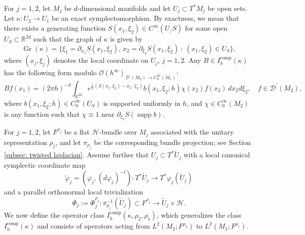 \documentclass[11pt,oneside,reqno]{amsart}
\newcommand\R{\ensuremath{\mathbb{R}}}
\theoremstyle{definition}
\numberwithin{equation}{section}
\theoremstyle{plain}
\begin{document}
For $j=1,2$, let $M_{j}$ be $d$-dimensional manifolds and let $U_j\subset T^*M_j$ be open sets. Let $\kappa: U_2 \rightarrow U_1 $ be an exact symplectomorphism. By exactness, we mean that there exists a generating function $S(x_1,\xi_2)\in C^\infty (U_/S)$ for some open $U_S\subset \R^{2d}$ such that the graph of $\kappa$ is given by 
\begin{equation*}
    \operatorname{Gr}(\kappa)= \{\xi_{1}=\partial_{x_1} S(x_1, \xi_2), \, x_{2}=\partial_{\xi_2} S(x_1, \xi_2)\ : \  (x_1, \xi_2) \in U_S \},
\end{equation*}
where $(x_j,\xi_j)$ denotes the local coordinate on $U_j$, $j=1,2$. Any $B \in I_h^{\mathrm{comp}}(\kappa)$ has the following form modulo $\mathcal{O}(h^{\infty})_{\mathcal{D}^{\prime}\left(M_2\right) \rightarrow C_0^{\infty}\left(M_1\right)}$:
\begin{equation*}
    B f(x_1)=(2 \pi h)^{-d} \int_{\mathbb{R}^{2d}} e^{\frac{i}{h}(S(x_1, \xi_2)-x_2 \cdot \xi_2)} b(x_1, \xi_2 ; h) \chi(x_2) f(x_2) \,d x_2 d \xi_2, \quad f \in \mathcal{D}^{\prime}(M_2),
\end{equation*}
where $b(x_1, \xi_2 ; h) \in C_{0}^{\infty}(U_S)$ is supported uniformly in $h$, and $\chi \in C_0^{\infty} (M_2 )$ is any function such that $\chi \equiv 1$ near $\partial_{\xi_2} S(\operatorname{supp} b)$.

For $j=1,2$, let $F^{\rho_{j}}$ be a flat $\mathcal{H}$-bundle over $M_{j}$ associated with the unitary representation $\rho_j$, and let $\pi_{\rho_j}$ be the corresponding bundle projection; see Section \ref{subsec: twisted laplacian}. Assume further that $U_{j} \subset T^*\widetilde{U}_{j}$ with a local canonical symplectic coordinate map 
\begin{equation*}
    \widetilde{\varphi}_{j}=(\varphi_{j},(d\varphi_{j})^{-t}): T^*\widetilde{U}_{j} \rightarrow T^* \varphi_j(\widetilde{U}_{j})
\end{equation*}
and a parallel orthonormal local trivialization
\begin{equation*}
    \Phi_{j}:=\Phi_{j}^{\rho_j}: \pi^{-1}_{\rho_{j}}(\widetilde{U}_{j}) \subset F^{\rho_j}\to \widetilde{U}_{j}\times \mathcal{H}.
\end{equation*}
We now define the operator class $I_{h}^{\mathrm{comp}}(\kappa,\rho_{2},\rho_{1})$, which generalizes the class $I_{h}^{\mathrm{comp}}(\kappa)$ and consists of operators acting from  $L^2(M_{2};F^{\rho_{2}}) $ to $L^2(M_{1};F^{\rho_{1}})$.
\end{document}
